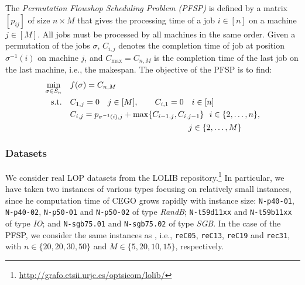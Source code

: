 \documentclass[sigconf,dvipsnames]{acmart}
\begin{document}
The \emph{Permutation Flowshop Scheduling Problem (PFSP)} is defined by a matrix $[p_{ij}]$ of size $n \times M$ that gives the processing time of a job $i \in [n]$ on a machine $j \in [M]$. All jobs must be processed by all machines in the same order. Given a permutation of the jobs $\sigma$, $C_{i,j}$ denotes the completion time of job at position $\sigma^{-1}(i)$ on machine $j$, and $C_{\max} = C_{n,M}$  is the completion time of the last job on the last machine, i.e., the makespan. The objective of the PFSP is to find:
\begin{equation}\label{eq:pfsp}
  \begin{split}
    \min_{\sigma \in S_n}\quad& f(\sigma) = C_{n,M}\\
    \text{s.t.}\quad & C_{1,j} = 0 \quad j\in [M], \qquad C_{i,1} = 0\quad i \in [n]\\
    &C_{i,j} = p_{\sigma^{-1}(i),j} + \max\{C_{i-1, j}, C_{i, j-1}\}  \ \  i \in \{2,\dotsc,n\},\\
    &\hspace{14.5em} j \in\{2,\dotsc, M\}
  \end{split}
\end{equation}

\subsubsection{Datasets}
%
We consider real LOP datasets from the LOLIB
repository.\footnote{\url{http://grafo.etsii.urjc.es/optsicom/lolib/}} In
particular, we have taken two instances of various types focusing on relatively
small instances, since he computation time of CEGO grows rapidly with instance
size: \texttt{N-p40-01}, \texttt{N-p40-02}, \texttt{N-p50-01} and
\texttt{N-p50-02} of type \emph{RandB}; \texttt{N-t59d11xx} and
\texttt{N-t59b11xx} of type \emph{IO}; and \texttt{N-sgb75.01} and
\texttt{N-sgb75.02} of type \emph{SGB}.
In the case of the PFSP, we consider the same instances as
\citet{ZaeStoBar2014:ppsn}, i.e., \texttt{reC05}, \texttt{reC13},
\texttt{reC19} and \texttt{rec31}, with $n \in \{20, 20, 30, 50\}$ and $M \in \{5, 20, 10, 15\}$, respectively.
\end{document}
